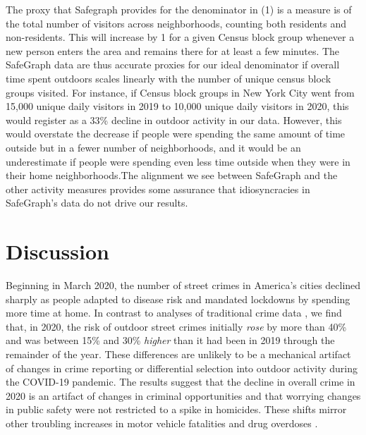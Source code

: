 \documentclass[12pt]{article}
\begin{document}
The proxy that Safegraph provides for the denominator in (1) is a measure is of the total number of visitors across neighborhoods, counting both residents and non-residents. This will increase by 1 for a given Census block group whenever a new person enters the area and remains there for at least a few minutes. The SafeGraph data are thus accurate proxies for our ideal denominator if overall time spent outdoors scales linearly with the number of unique census block groups visited. For instance, if Census block groups in New York City went from 15,000 unique daily visitors in 2019 to 10,000 unique daily visitors in 2020, this would register as a 33\% decline in outdoor activity in our data. However, this would overstate the decrease if people were spending the same amount of time outside but in a fewer number of neighborhoods, and it would be an underestimate if people were spending even less time outside when they were in their home neighborhoods.The alignment we see between SafeGraph and the other activity measures provides some assurance that idiosyncracies in SafeGraph's data do not drive our results.




\section{Discussion}
Beginning in March 2020, the number of street crimes in America's cities declined sharply as people adapted to disease risk and mandated lockdowns by spending more time at home. In contrast to analyses of traditional crime data \citep{abrams2021covid}, we find that, in 2020, the risk of outdoor street crimes initially \emph{rose} by more than 40\% and was between 15\% and 30\% \emph{higher} than it had been in 2019 through the remainder of the year. These differences are unlikely to be a mechanical artifact of changes in crime reporting or differential selection into outdoor activity during the COVID-19 pandemic. 
The results suggest that the decline in overall crime in 2020 is an artifact of changes in criminal opportunities and that worrying changes in public safety were not restricted to a spike in homicides. %
These shifts mirror other troubling increases in motor vehicle fatalities \citep{stewart2022overview} and drug overdoses \citep{stephenson2020drug}.
\end{document}
